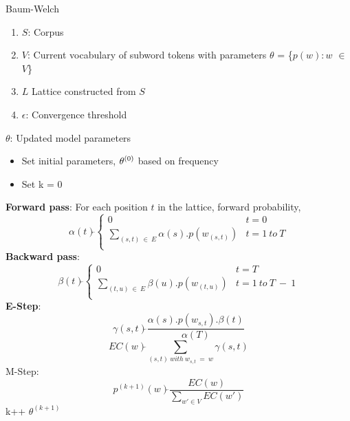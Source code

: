 \documentclass[twoside,11pt]{article}
\begin{document}
\begin{algorithm}[H]
\caption{Baum-Welch} 
\begin{algorithmic}[1]
 \renewcommand{\algorithmicrequire}{\textbf{Input:}}
 \renewcommand{\algorithmicensure}{\textbf{Output:}}
 \REQUIRE
 \begin{enumerate}
     \item $S$: Corpus
     \item $V$: Current vocabulary of subword tokens with parameters $\theta$ = \{$p(w): w$ $\in$ $V$\} 
     \item $L$ Lattice constructed from $S$
     \item $\epsilon$: Convergence threshold
 \end{enumerate}
 \ENSURE  $\theta$: Updated model parameters
 \begin{itemize}
     \item Set initial parameters, $\theta \textsuperscript{(0)}$ based on frequency
     \item Set k = 0
 \end{itemize}
    

    \STATE \textbf{Forward pass}: 
     For each position $t$ in the lattice, forward probability, 
     \[ \alpha(t) \overleftarrow{} \begin{cases} 
          0 & t = 0 \\
          \sum_{(s, t) \ \in\  E} \alpha(s) . p(w_{(s,t)}) & t = 1\  to\  T \\
          
       \end{cases}
    \]
    \ENDFOR
    \STATE \textbf{Backward pass}: 
     \[ \beta(t) \overleftarrow{} \begin{cases} 
          0 & t = T \\
          \sum_{(t, u) \ \in\  E} \beta(u) . p(w_{(t,u)}) & t = 1\   to\   T\ -\ 1 \\
          
       \end{cases}
    \]
    \ENDFOR
    \STATE \textbf{E-Step}: 
        \[ \gamma(s,t) \overleftarrow{} \frac{\alpha(s).p(w_{s,t}
        ). \beta(t)}{\alpha(T)}
        \]
    \ENDFOR
    \[
        EC(w) \overleftarrow{} \sum_{(s,t)\ with\ w_{s,t}\ =\ w} \gamma(s,t)
    \]
    \ENDFOR
    \STATE M-Step:
    \[
        p^{(k+1)}(w) \overleftarrow{} \frac{EC(w)}{\sum_{w' \in V} EC(w')}
    \]
    \ENDFOR
    \STATE k++
  \ENDWHILE
  \RETURN $\theta^{(k+1)}$
\end{algorithmic}
\end{algorithm}
\end{document}
